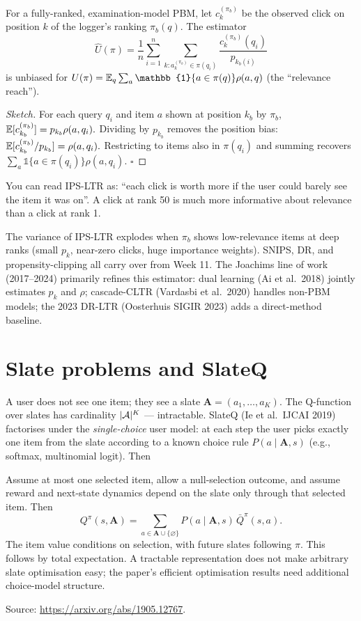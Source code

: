 \documentclass[11pt,oneside]{scrbook}
\begin{document}
\begin{theorem}
For a fully-ranked, examination-model PBM, let $c_k^{(\pi_b)}$ be the
observed click on position $k$ of the logger's ranking $\pi_b(q)$.
The estimator
\[
\hat U(\pi) = \frac{1}{n} \sum_{i=1}^n \sum_{k: a_k^{(\pi_b)} \in \pi(q_i)}
\frac{c_k^{(\pi_b)}(q_i)}{p_{k_b(i)}}
\]
is unbiased for $U(\pi) = \E_q \sum_a \mathbb{1}\{a \in \pi(q)\} \rho(a, q)$
(the ``relevance reach'').
\end{theorem}

\begin{proof}[Sketch]
For each query $q_i$ and item $a$ shown at position $k_b$ by $\pi_b$,
\(
\mathbb{E}[c_{k_b}^{(\pi_b)}] = p_{k_b} \rho(a, q_i).
\)
Dividing by $p_{k_b}$ removes the position bias:
\(
\mathbb{E}[c_{k_b}^{(\pi_b)} / p_{k_b}] = \rho(a, q_i).
\)
Restricting to items also in $\pi(q_i)$ and summing recovers $\sum_a \mathbb{1}\{a \in \pi(q_i)\}\rho(a, q_i)$. $\square$
\end{proof}

\begin{intuition}
You can read IPS-LTR as: ``each click is worth more if the user could
barely see the item it was on''. A click at rank 50 is much more
informative about relevance than a click at rank 1.
\end{intuition}

The variance of IPS-LTR explodes when $\pi_b$ shows low-relevance items at
deep ranks (small $p_k$, near-zero clicks, huge importance weights). SNIPS,
DR, and propensity-clipping all carry over from Week 11. The Joachims line
of work (2017--2024) primarily refines this estimator: dual learning (Ai
et al.\ 2018) jointly estimates $p_k$ and $\rho$; cascade-CLTR (Vardasbi
et al.\ 2020) handles non-PBM models; the 2023 DR-LTR (Oosterhuis SIGIR
2023) adds a direct-method baseline.

\section{Slate problems and SlateQ}

A user does not see one item; they see a slate $\mathbf{A} = (a_1, \dots, a_K)$.
The Q-function over slates has cardinality $|\mathcal{A}|^K$ --- intractable.
SlateQ (Ie et al.\ IJCAI 2019) factorises under the \emph{single-choice}
user model: at each step the user picks exactly one item from the slate
according to a known choice rule $P(a \mid \mathbf{A}, s)$ (e.g., softmax,
multinomial logit). Then

\begin{proposition}
Assume at most one selected item, allow a null-selection outcome, and
assume reward and next-state dynamics depend on the slate only through
that selected item. Then
\[
Q^\pi(s,\mathbf A)=\sum_{a\in\mathbf A\cup\{\varnothing\}}
P(a\mid\mathbf A,s)\,\bar Q^\pi(s,a).
\]
The item value conditions on selection, with future slates following $\pi$.
This follows by total expectation. A tractable representation does not
make arbitrary slate optimisation easy; the paper's efficient optimisation
results need additional choice-model structure.
\end{proposition}
Source: \url{https://arxiv.org/abs/1905.12767}.
\end{document}
